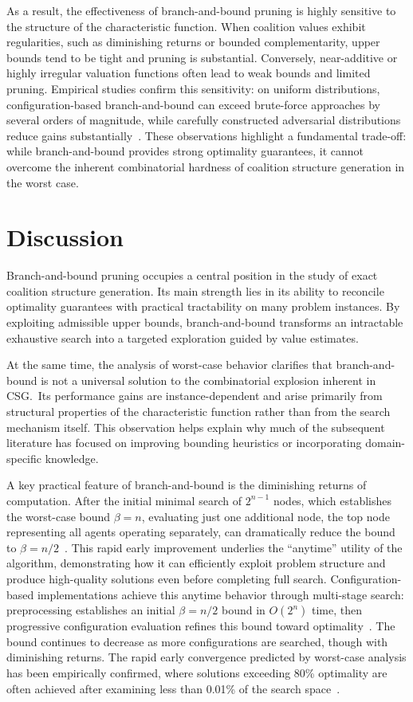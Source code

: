 \documentclass{article}
\begin{document}
As a result, the effectiveness of branch-and-bound pruning is highly sensitive to the structure of the characteristic function. When coalition values exhibit regularities, such as diminishing returns or bounded complementarity, upper bounds tend to be tight and pruning is substantial. Conversely, near-additive or highly irregular valuation functions often lead to weak bounds and limited pruning. Empirical studies confirm this sensitivity: on uniform distributions, configuration-based branch-and-bound can exceed brute-force approaches by several orders of magnitude, while carefully constructed adversarial distributions reduce gains substantially~\cite{rahwan2007near,prantare2017algorithm}. These observations highlight a fundamental trade-off: while branch-and-bound provides strong optimality guarantees, it cannot overcome the inherent combinatorial hardness of coalition structure generation in the worst case.

\section{Discussion}

Branch-and-bound pruning occupies a central position in the study of exact coalition structure generation. Its main strength lies in its ability to reconcile optimality guarantees with practical tractability on many problem instances. By exploiting admissible upper bounds, branch-and-bound transforms an intractable exhaustive search into a targeted exploration guided by value estimates.

At the same time, the analysis of worst-case behavior clarifies that branch-and-bound is not a universal solution to the combinatorial explosion inherent in CSG.\ Its performance gains are instance-dependent and arise primarily from structural properties of the characteristic function rather than from the search mechanism itself. This observation helps explain why much of the subsequent literature has focused on improving bounding heuristics or incorporating domain-specific knowledge.

A key practical feature of branch-and-bound is the diminishing returns of computation. After the initial minimal search of $2^{n-1}$ nodes, which establishes the worst-case bound $\beta = n$, evaluating just one additional node, the top node representing all agents operating separately, can dramatically reduce the bound to $\beta = n/2$~\cite{sandholm1999coalition}. This rapid early improvement underlies the ``anytime'' utility of the algorithm, demonstrating how it can efficiently exploit problem structure and produce high-quality solutions even before completing full search. Configuration-based implementations achieve this anytime behavior through multi-stage search: preprocessing establishes an initial $\beta = n/2$ bound in $O(2^n)$ time, then progressive configuration evaluation refines this bound toward optimality~\cite{rahwan2007near}. The bound continues to decrease as more configurations are searched, though with diminishing returns. The rapid early convergence predicted by worst-case analysis has been empirically confirmed, where solutions exceeding 80\% optimality are often achieved after examining less than 0.01\% of the search space~\cite{rahwan2007near}.
\end{document}
